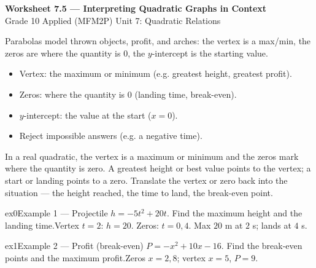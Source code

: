 \documentclass[11pt]{article}
\begin{document}
\begin{center}
{\LARGE\bfseries\color{titleblue}Worksheet 7.5 --- Interpreting Quadratic Graphs in Context}\\[2pt]
{\small Grade 10 Applied (MFM2P) \textperiodcentered{} Unit 7: Quadratic Relations}
\end{center}

\begin{ideabox}
Parabolas model thrown objects, profit, and arches: the vertex is a max/min, the zeros are where the quantity is $0$, the $y$-intercept is the starting value.
\begin{itemize}[leftmargin=*,itemsep=2pt]
  \item Vertex: the maximum or minimum (e.g. greatest height, greatest profit).
  \item Zeros: where the quantity is $0$ (landing time, break-even).
  \item $y$-intercept: the value at the start ($x=0$).
  \item Reject impossible answers (e.g. a negative time).
\end{itemize}
\end{ideabox}

\begin{learnbox}
In a real quadratic, the vertex is a maximum or minimum and the zeros mark where the quantity is zero.
A greatest height or best value points to the vertex; a start or landing points to a zero.
Translate the vertex or zero back into the situation — the height reached, the time to land, the break-even point.
\end{learnbox}


\begin{example}{ex0}{Example 1 --- Projectile}
$h=-5t^2+20t$. Find the maximum height and the landing time.\soln Vertex $t=2$: $h=20$. Zeros: $t=0,4$. Max $20$ m at $2$ s; lands at $4$ s.
\end{example}

\begin{example}{ex1}{Example 2 --- Profit (break-even)}
$P=-x^2+10x-16$. Find the break-even points and the maximum profit.\soln Zeros $x=2,8$; vertex $x=5$, $P=9$.
\end{example}
\end{document}
